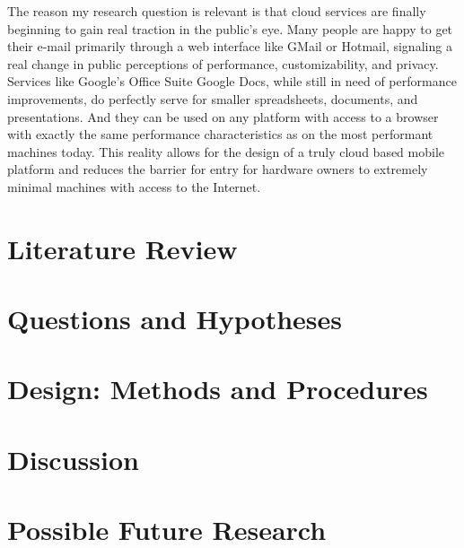\documentclass[12pt,oneside,letterpaper,titlepage]{report}
\begin{document}

The reason my research question is relevant is that cloud services are finally
beginning to gain real traction in the public's eye.  Many people are happy to
get their e-mail primarily through a web interface like GMail or Hotmail,
signaling a real change in public perceptions of performance, customizability,
and privacy.  Services like Google's Office Suite Google Docs, while still in
need of performance improvements, do perfectly serve for smaller spreadsheets,
documents, and presentations.  And they can be used on any platform with access
to a browser with exactly the same performance characteristics as on the most
performant machines today.  This reality allows for the design of a truly cloud
based mobile platform and reduces the barrier for entry for hardware owners to
extremely minimal machines with access to the Internet.

\chapter{Literature Review}

\newpage

  

\chapter{Questions and Hypotheses}

\newpage

  

\chapter{Design: Methods and Procedures}

\newpage

  

\chapter{Discussion}

\newpage

  

\chapter{Possible Future Research}
\end{document}
